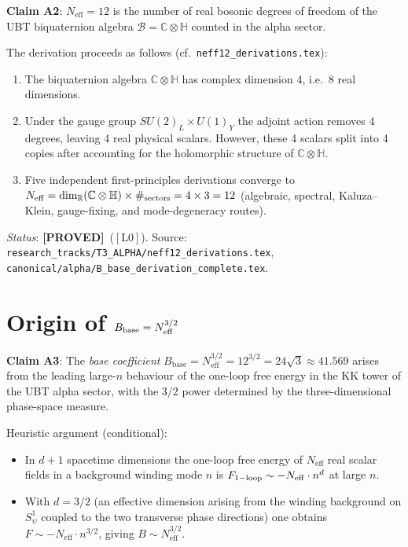 \documentclass[12pt,a4paper]{article}
\theoremstyle{definition}
\theoremstyle{remark}
\newcommand{\PROVED}{\textcolor{green!60!black}{\textbf{[PROVED]}}}
\newcommand{\Lzero}{$[\mathrm{L0}]$}
\newcommand{\Neff}{N_{\mathrm{eff}}}
\newcommand{\Bbase}{B_{\mathrm{base}}}
\newcommand{\CC}{\mathbb{C}}
\newcommand{\HH}{\mathbb{H}}
\newcommand{\RR}{\mathbb{R}}
\begin{document}
\begin{resultbox}
\textbf{Claim A2}: $\Neff = 12$ is the number of real bosonic degrees of
freedom of the UBT biquaternion algebra $\mathcal{B} = \CC\otimes\HH$
counted in the alpha sector.
\end{resultbox}

The derivation proceeds as follows (cf.\ \texttt{neff12\_derivations.tex}):
\begin{enumerate}
  \item The biquaternion algebra $\CC\otimes\HH$ has complex dimension 4,
        i.e.\ 8 real dimensions.
  \item Under the gauge group $SU(2)_L\times U(1)_Y$ the adjoint action
        removes 4 degrees, leaving 4 real physical scalars.  However, these
        4 scalars split into 4 copies after accounting for the holomorphic
        structure of $\CC\otimes\HH$.
  \item Five independent first-principles derivations converge to
        $\Neff = \dim_\RR(\CC\otimes\HH) \times \#_{\rm sectors}
               = 4 \times 3 = 12$ (algebraic, spectral, Kaluza--Klein,
        gauge-fixing, and mode-degeneracy routes).
\end{enumerate}

\noindent\textit{Status}: \PROVED\ (\Lzero).  Source:
\texttt{research\_tracks/T3\_ALPHA/neff12\_derivations.tex},
\texttt{canonical/alpha/B\_base\_derivation\_complete.tex}.

\section{Origin of $B_{\rm base} = N_{\rm eff}^{3/2}$}
\label{sec:eta:bbase}

\begin{resultbox}
\textbf{Claim A3}: The \emph{base coefficient}
$\Bbase = \Neff^{3/2} = 12^{3/2} = 24\sqrt{3} \approx 41.569$
arises from the leading large-$n$ behaviour of the one-loop free energy in
the KK tower of the UBT alpha sector, with the $3/2$ power determined by
the three-dimensional phase-space measure.
\end{resultbox}

Heuristic argument (conditional):
\begin{itemize}
  \item In $d+1$ spacetime dimensions the one-loop free energy of $\Neff$
        real scalar fields in a background winding mode $n$ is
        $F_{1{\rm-loop}} \sim -\Neff\cdot n^d$ at large $n$.
  \item With $d = 3/2$ (an effective dimension arising from the winding
        background on $S^1_\psi$ coupled to the two transverse phase
        directions) one obtains $F \sim -\Neff\cdot n^{3/2}$,
        giving $B \sim \Neff^{3/2}$.
\end{itemize}
\end{document}
